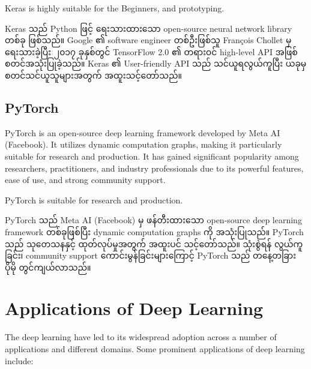 \begin{remark}
    Keras is highly suitable for the Beginners, and prototyping.
\end{remark}

Keras \cite{web:Keras} သည် Python ဖြင့် ရေးသားထားသော open-source neural network library တစ်ခု ဖြစ်သည်။ Google ၏ software engineer တစ်ဦးဖြစ်သူ  François Chollet မှ ရေးသားခဲ့ပြီး ၂၀၁၇ ခုနှစ်တွင် TensorFlow 2.0 ၏ တရား၀င်  high-level API အဖြစ် စတင်အသုံးပြုခဲ့သည်။ Keras ၏ User-friendly API သည် သင်ယူရလွယ်ကူပြီး ယခုမှ စတင်သင်ယူသူများအတွက် အထူးသင့်တော်သည်။

\subsection{PyTorch} \label{subsec:PyTorch}

PyTorch \cite{web:pyTorch} is an open-source deep learning framework developed by Meta AI (Facebook). It utilizes dynamic computation graphs, making it particularly suitable for research and production. It has gained significant popularity among researchers, practitioners, and industry professionals due to its powerful features, ease of use, and strong community support.

\begin{remark}
    PyTorch is suitable for research and production.
\end{remark}

PyTorch \cite{web:pyTorch} သည် Meta AI (Facebook) မှ ဖန်တီးထားသော open-source deep learning framework တစ်ခုဖြစ်ပြီး dynamic computation graphs ကို အသုံးပြုသည်။ PyTorch သည် သုတေသနနှင့် ထုတ်လုပ်မှုအတွက် အထူးပင် သင့်တော်သည်။ သုံးစွဲရန် လွယ်ကူခြင်း၊ community support ကောင်းမွန်ခြင်းများကြောင့် PyTorch သည် တနေ့တခြား ပိုမို တွင်ကျယ်လာသည်။

\newpage
\section{Applications of Deep Learning} \label{sec:usecases}

The deep learning have led to its widespread adoption across a number of applications and different domains. Some prominent applications of deep learning include:

